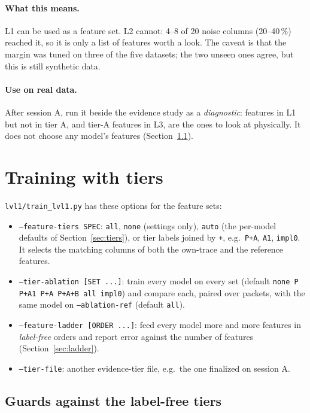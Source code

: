 \documentclass[10pt]{article}
\newcommand{\code}[1]{\texttt{#1}}
\begin{document}
\paragraph{What this means.} L1 can be used as a feature set. L2 cannot: 4--8 of 20 noise columns (20--40\,\%) reached
it, so it is only a list of features worth a look. The caveat is that the margin was tuned on three of the five
datasets; the two unseen ones agree, but this is still synthetic data.

\paragraph{Use on real data.} After session A, run it beside the evidence study as a \emph{diagnostic}: features in L1
but not in tier A, and tier-A features in L3, are the ones to look at physically. It does not choose any model's
features (Section~\ref{sec:guards}).

\section{Training with tiers}
\label{sec:tooling}

\code{lvl1/train\_lvl1.py} has these options for the feature sets:

\begin{itemize}
  \item \code{--feature-tiers SPEC}: \code{all}, \code{none} (settings only), \code{auto} (the per-model defaults of
        Section~\ref{sec:tiers}), or tier labels joined by \code{+}, e.g.\ \code{P+A}, \code{A1}, \code{impl0}. It
        selects the matching columns of both the own-trace and the reference features.
  \item \code{--tier-ablation [SET ...]}: train every model on every set (default \code{none P P+A1 P+A P+A+B all impl0})
        and compare each, paired over packets, with the same model on \code{--ablation-ref} (default \code{all}).
  \item \code{--feature-ladder [ORDER ...]}: feed every model more and more features in \emph{label-free} orders and
        report error against the number of features (Section~\ref{sec:ladder}).
  \item \code{--tier-file}: another evidence-tier file, e.g.\ the one finalized on session A.
\end{itemize}

\subsection{Guards against the label-free tiers}
\label{sec:guards}
\end{document}
